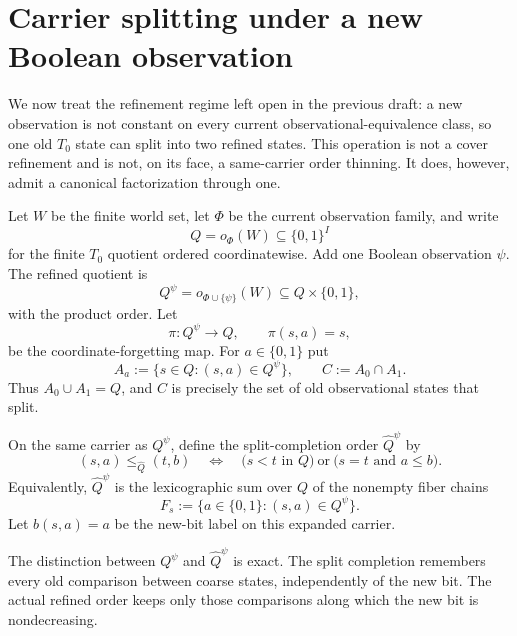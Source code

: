 \section{Carrier splitting under a new Boolean observation}\label{sec:carrier-splitting}

We now treat the refinement regime left open in the previous draft: a new
observation is not constant on every current observational-equivalence class, so
one old $T_0$ state can split into two refined states.  This operation is not a
cover refinement and is not, on its face, a same-carrier order thinning.  It does,
however, admit a canonical factorization through one.

Let $W$ be the finite world set, let $\Phi$ be the current observation family,
and write
\[
 Q=o_\Phi(W)\subseteq\{0,1\}^{I}
\]
for the finite $T_0$ quotient ordered coordinatewise.  Add one Boolean
observation $\psi$.  The refined quotient is
\[
 Q^\psi=o_{\Phi\cup\{\psi\}}(W)
 \subseteq Q\times\{0,1\},
\]
with the product order.  Let
\[
 \pi:Q^\psi\longrightarrow Q,
 \qquad \pi(s,a)=s,
\]
be the coordinate-forgetting map.  For $a\in\{0,1\}$ put
\[
 A_a:=\{s\in Q:(s,a)\in Q^\psi\},
 \qquad C:=A_0\cap A_1.
\]
Thus $A_0\cup A_1=Q$, and $C$ is precisely the set of old observational
states that split.

\begin{definition}
On the same carrier as $Q^\psi$, define the split-completion order
$\widehat Q^\psi$ by
\[
 (s,a)\leq_{\widehat Q}(t,b)
 \quad\Longleftrightarrow\quad
 \bigl(s<t\text{ in }Q\bigr)
 \ \text{or}\ 
 \bigl(s=t\text{ and }a\leq b\bigr).
\]
Equivalently, $\widehat Q^\psi$ is the lexicographic sum over $Q$ of the
nonempty fiber chains
\[
 F_s:=\{a\in\{0,1\}:(s,a)\in Q^\psi\}.
\]
Let $b(s,a)=a$ be the new-bit label on this expanded carrier.
\end{definition}

The distinction between $Q^\psi$ and $\widehat Q^\psi$ is exact.  The split
completion remembers every old comparison between coarse states, independently
of the new bit.  The actual refined order keeps only those comparisons along
which the new bit is nondecreasing.

